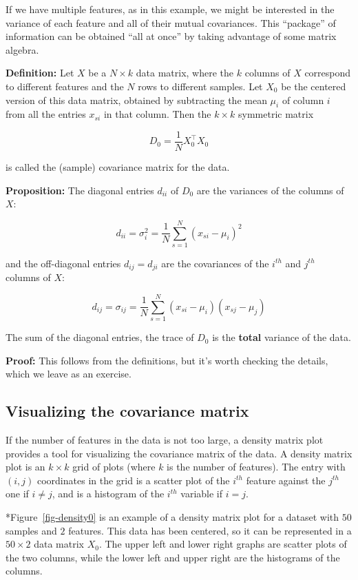 \documentclass[
  11pt,
  letterpaper,
]{scrbook}
\theoremstyle{plain}
\theoremstyle{plain}
\theoremstyle{remark}
\begin{document}
If we have multiple features, as in this example, we might be interested
in the variance of each feature and all of their mutual covariances.
This ``package'' of information can be obtained ``all at once'' by
taking advantage of some matrix algebra.

\textbf{Definition:} Let \(X\) be a \(N\times k\) data matrix, where the
\(k\) columns of \(X\) correspond to different features and the \(N\)
rows to different samples. Let \(X_{0}\) be the centered version of this
data matrix, obtained by subtracting the mean \(\mu_{i}\) of column
\(i\) from all the entries \(x_{si}\) in that column. Then the
\(k\times k\) symmetric matrix

\[
D_{0} = \frac{1}{N}X_{0}^{\intercal}X_{0}
\]

is called the (sample) covariance matrix for the data.

\textbf{Proposition:} The diagonal entries \(d_{ii}\) of \(D_{0}\) are
the variances of the columns of \(X\):

\[
d_{ii} = \sigma_{i}^2 = \frac{1}{N}\sum_{s=1}^{N}(x_{si}-\mu_i)^2
\]

and the off-diagonal entries \(d_{ij} = d_{ji}\) are the covariances of
the \(i^{th}\) and \(j^{th}\) columns of \(X\):

\[
d_{ij} = \sigma_{ij} = \frac{1}{N}\sum_{s=1}^{N}(x_{si}-\mu_{i})(x_{sj}-\mu_{j})
\]

The sum of the diagonal entries, the trace of \(D_{0}\) is the
\textbf{total} variance of the data.

\textbf{Proof:} This follows from the definitions, but it's worth
checking the details, which we leave as an exercise.

\hypertarget{sec-visualizecovar}{%
\subsection{Visualizing the covariance
matrix}\label{sec-visualizecovar}}

If the number of features in the data is not too large, a density matrix
plot provides a tool for visualizing the covariance matrix of the data.
A density matrix plot is an \(k\times k\) grid of plots (where \(k\) is
the number of features). The entry with \((i,j)\) coordinates in the
grid is a scatter plot of the \(i^{th}\) feature against the \(j^{th}\)
one if \(i\not=j\), and is a histogram of the \(i^{th}\) variable if
\(i=j\).

*Figure~\ref{fig-density0} is an example of a density matrix plot for a
dataset with \(50\) samples and \(2\) features. This data has been
centered, so it can be represented in a \(50\times 2\) data matrix
\(X_{0}\). The upper left and lower right graphs are scatter plots of
the two columns, while the lower left and upper right are the histograms
of the columns.
\end{document}

